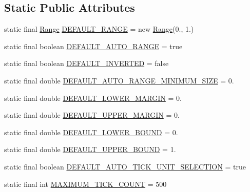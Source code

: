 \subsection*{Static Public Attributes}
\begin{DoxyCompactItemize}
\item 
static final \mbox{\hyperlink{classorg_1_1jfree_1_1data_1_1_range}{Range}} \mbox{\hyperlink{classorg_1_1jfree_1_1chart_1_1axis_1_1_value_axis_a24b0e19d3e3e4467a6fdcb54b1f1ebfc}{D\+E\+F\+A\+U\+L\+T\+\_\+\+R\+A\+N\+GE}} = new \mbox{\hyperlink{classorg_1_1jfree_1_1data_1_1_range}{Range}}(0., 1.)
\item 
static final boolean \mbox{\hyperlink{classorg_1_1jfree_1_1chart_1_1axis_1_1_value_axis_ac6a1ae4d842a520f7b40e27d74a3a9f8}{D\+E\+F\+A\+U\+L\+T\+\_\+\+A\+U\+T\+O\+\_\+\+R\+A\+N\+GE}} = true
\item 
static final boolean \mbox{\hyperlink{classorg_1_1jfree_1_1chart_1_1axis_1_1_value_axis_a3a946f6a90afc4dd02da99431898e6c1}{D\+E\+F\+A\+U\+L\+T\+\_\+\+I\+N\+V\+E\+R\+T\+ED}} = false
\item 
static final double \mbox{\hyperlink{classorg_1_1jfree_1_1chart_1_1axis_1_1_value_axis_a1f7e34821431de8adb5a5dd5eb6a5369}{D\+E\+F\+A\+U\+L\+T\+\_\+\+A\+U\+T\+O\+\_\+\+R\+A\+N\+G\+E\+\_\+\+M\+I\+N\+I\+M\+U\+M\+\_\+\+S\+I\+ZE}} = 0.
\item 
static final double \mbox{\hyperlink{classorg_1_1jfree_1_1chart_1_1axis_1_1_value_axis_a3b253e3bc69420d9806b9e6cdb7dd889}{D\+E\+F\+A\+U\+L\+T\+\_\+\+L\+O\+W\+E\+R\+\_\+\+M\+A\+R\+G\+IN}} = 0.
\item 
static final double \mbox{\hyperlink{classorg_1_1jfree_1_1chart_1_1axis_1_1_value_axis_ab47fc12de101dc3d8f5c793d0064d50e}{D\+E\+F\+A\+U\+L\+T\+\_\+\+U\+P\+P\+E\+R\+\_\+\+M\+A\+R\+G\+IN}} = 0.
\item 
static final double \mbox{\hyperlink{classorg_1_1jfree_1_1chart_1_1axis_1_1_value_axis_a1cfc6f3f33488b64e70044c7c135e0ed}{D\+E\+F\+A\+U\+L\+T\+\_\+\+L\+O\+W\+E\+R\+\_\+\+B\+O\+U\+ND}} = 0.
\item 
static final double \mbox{\hyperlink{classorg_1_1jfree_1_1chart_1_1axis_1_1_value_axis_a2aa5bfbb2eb26cafe6ed864d339a005a}{D\+E\+F\+A\+U\+L\+T\+\_\+\+U\+P\+P\+E\+R\+\_\+\+B\+O\+U\+ND}} = 1.
\item 
static final boolean \mbox{\hyperlink{classorg_1_1jfree_1_1chart_1_1axis_1_1_value_axis_a06194fc5abd3b2df8b9edd49f16a4838}{D\+E\+F\+A\+U\+L\+T\+\_\+\+A\+U\+T\+O\+\_\+\+T\+I\+C\+K\+\_\+\+U\+N\+I\+T\+\_\+\+S\+E\+L\+E\+C\+T\+I\+ON}} = true
\item 
static final int \mbox{\hyperlink{classorg_1_1jfree_1_1chart_1_1axis_1_1_value_axis_a8d9640786e017770399d3fb4bb0fb2e1}{M\+A\+X\+I\+M\+U\+M\+\_\+\+T\+I\+C\+K\+\_\+\+C\+O\+U\+NT}} = 500
\end{DoxyCompactItemize}

